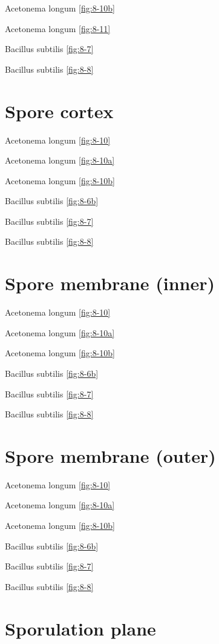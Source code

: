 \documentclass[]{tufte-book}
\begin{document}
Acetonema longum \ref{fig:8-10b}

Acetonema longum \ref{fig:8-11}

Bacillus subtilis \ref{fig:8-7}

Bacillus subtilis \ref{fig:8-8}

\section*{Spore cortex}\label{spore-cortex}

Acetonema longum \ref{fig:8-10}

Acetonema longum \ref{fig:8-10a}

Acetonema longum \ref{fig:8-10b}

Bacillus subtilis \ref{fig:8-6b}

Bacillus subtilis \ref{fig:8-7}

Bacillus subtilis \ref{fig:8-8}

\section*{Spore membrane (inner)}\label{spore-membrane-inner}

Acetonema longum \ref{fig:8-10}

Acetonema longum \ref{fig:8-10a}

Acetonema longum \ref{fig:8-10b}

Bacillus subtilis \ref{fig:8-6b}

Bacillus subtilis \ref{fig:8-7}

Bacillus subtilis \ref{fig:8-8}

\section*{Spore membrane (outer)}\label{spore-membrane-outer}

Acetonema longum \ref{fig:8-10}

Acetonema longum \ref{fig:8-10a}

Acetonema longum \ref{fig:8-10b}

Bacillus subtilis \ref{fig:8-6b}

Bacillus subtilis \ref{fig:8-7}

Bacillus subtilis \ref{fig:8-8}

\section*{Sporulation plane}\label{sporulation-plane}
\end{document}
